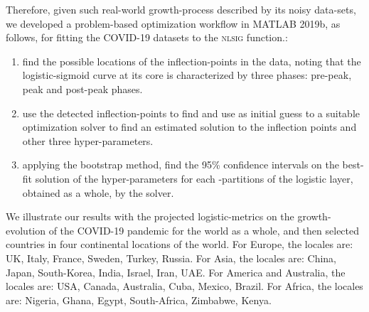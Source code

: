 \documentclass[journal]{IEEEtran}
\theoremstyle{plain}
\theoremstyle{definition}
\theoremstyle{remark}
\begin{document}
Therefore, given such real-world growth-process described by its noisy data-sets, we developed a problem-based optimization workflow in MATLAB 2019b, as follows, for fitting the COVID-19 datasets to the \textsc{nlsig} function.:
\begin{enumerate}
	\item find the possible locations of the inflection-points in the data, noting that the logistic-sigmoid curve at its core is characterized by three phases: pre-peak, peak and post-peak phases.
	\item use the detected  inflection-points to find  and use as initial guess to a suitable optimization solver to find an estimated solution to the inflection points and other three hyper-parameters.
	\item applying the bootstrap method, find the 95\% confidence intervals on the best-fit solution of the  hyper-parameters for each -partitions of the logistic layer, obtained as a whole, by the solver.
\end{enumerate}
We illustrate our results with the projected logistic-metrics on the growth-evolution of the COVID-19 pandemic for the world as a whole, and then selected countries in four continental locations of the world.
For Europe, the locales are: UK, Italy, France, Sweden, Turkey, Russia. For Asia, the locales are: China, Japan, South-Korea, India, Israel, Iran, UAE. For America and Australia, the locales are: USA, Canada, Australia, Cuba, Mexico, Brazil. For Africa, the locales are: Nigeria, Ghana, Egypt, South-Africa, Zimbabwe, Kenya.
\end{document}
